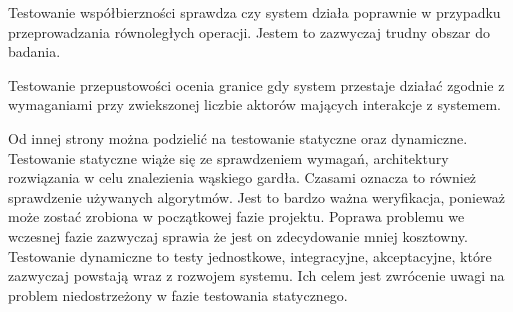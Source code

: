 Testowanie współbierzności sprawdza czy system działa poprawnie w przypadku przeprowadzania równoległych operacji.
Jestem to zazwyczaj trudny obszar do badania.

Testowanie przepustowości ocenia granice gdy system przestaje działać zgodnie z wymaganiami przy zwiekszonej liczbie aktorów mających interakcje z systemem.

Od innej strony można podzielić na testowanie statyczne oraz dynamiczne.
Testowanie statyczne wiąże się ze sprawdzeniem wymagań, architektury rozwiązania w celu znalezienia wąskiego gardła.
Czasami oznacza to również sprawdzenie używanych algorytmów.
Jest to bardzo ważna weryfikacja, ponieważ może zostać zrobiona w początkowej fazie projektu.
Poprawa problemu we wczesnej fazie zazwyczaj sprawia że jest on zdecydowanie mniej kosztowny.
Testowanie dynamiczne to testy jednostkowe, integracyjne, akceptacyjne, które zazwyczaj powstają wraz z rozwojem systemu.
Ich celem jest zwrócenie uwagi na problem niedostrzeżony w fazie testowania statycznego.
